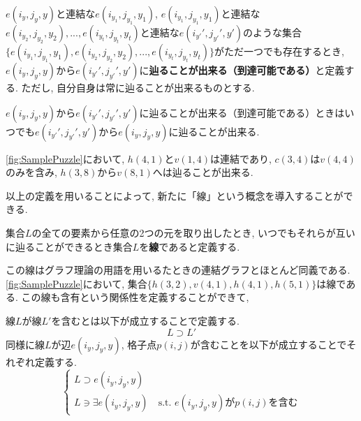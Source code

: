 \begin{definition}[到達可能]
  $e(i_y,j_y,y)$と連結な$e(i_{y_1},j_{y_1},y_1)$, $e(i_{y_1},j_{y_1},y_1)$と連結な$e(i_{y_2},j_{y_2},y_2),...,e(i_{y_t},j_{y_t},y_t)$と連結な$e(i_{y'}',j_{y'}',y')$のような集合\\
  $\{e(i_{y_1},j_{y_1},y_1),e(i_{y_2},j_{y_2},y_2),...,e(i_{y_t},j_{y_t},y_t)\}$がただ一つでも存在するとき, $e(i_y,j_y,y)$から$e(i_{y'}',j_{y'}',y')$に\textbf{辿ることが出来る（到達可能である）}と定義する. ただし, 自分自身は常に辿ることが出来るものとする.
\end{definition}

\begin{remark}
  $e(i_y,j_y,y)$から$e(i_{y'}',j_{y'}',y')$に辿ることが出来る（到達可能である）ときはいつでも$e(i_{y'}',j_{y'}',y')$から$e(i_y,j_y,y)$に辿ることが出来る.
\end{remark}

\begin{example}[連結, 含有, 到達可能]
  \cref{fig:SamplePuzzle}において, $h(4,1)$と$v(1,4)$は連結であり, $c(3,4)$は$v(4,4)$のみを含み, $h(3,8)$から$v(8,1)$へは辿ることが出来る.
\end{example}
以上の定義を用いることによって, 新たに「線」という概念を導入することができる.

\begin{definition}[線]\label{definition:Line}
  集合$L$の全ての要素から任意の2つの元を取り出したとき, いつでもそれらが互いに辿ることができるとき集合$L$を\textbf{線}であると定義する.
\end{definition}
この線はグラフ理論の用語を用いるたときの連結グラフとほとんど同義である. \cref{fig:SamplePuzzle}において, 集合$\{h(3,2),v(4,1),h(4,1),h(5,1)\}$は線である. この線も含有という関係性を定義することができて,
\begin{definition}[線の含有]
  線$L$が線$L'$を含むとは以下が成立することで定義する.
  \begin{equation*}
    L\supset L'
  \end{equation*}
  同様に線$L$が辺$e(i_y,j_y,y)$, 格子点$p(i,j)$が含むことを以下が成立することでそれぞれ定義する.
  \begin{equation*}
    \begin{cases}
      {L\supset  e(i_y,j_y,y) } \\
      {L\ni \exists e(i_y,j_y,y) \quad \mbox{s.t. $e(i_y,j_y,y)$が$p(i,j)$を含む}}
    \end{cases}
  \end{equation*}
\end{definition}

